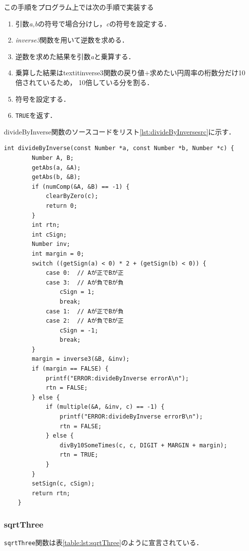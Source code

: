 \documentclass[a4paper,11pt,dvipdfmx]{jsarticle}
\begin{document}
この手順をプログラム上では次の手順で実装する

\begin{enumerate}
    \item 引数\textit{a,b}の符号で場合分けし，\textit{c}の符号を設定する．
    \item \textit{inverse3}関数を用いて逆数を求める．
    \item 逆数を求めた結果を引数\textit{a}と乗算する．
    \item 乗算した結果はtextit{inverse3}関数の戻り値$+$求めたい円周率の桁数分だけ10倍されているため，
    10倍している分を割る．
    \item 符号を設定する．
    \item \texttt{TRUE}を返す．
\end{enumerate}

divideByInverse関数のソースコードをリスト\ref{lst:divideByInversesrc}に示す．

\begin{lstlisting}[caption=\texttt{divideByInverse}関数,label=lst:divideByInversesrc]
    int divideByInverse(const Number *a, const Number *b, Number *c) {
        Number A, B;
        getAbs(a, &A);
        getAbs(b, &B);
        if (numComp(&A, &B) == -1) {
            clearByZero(c);
            return 0;
        }
        int rtn;
        int cSign;
        Number inv;
        int margin = 0;
        switch ((getSign(a) < 0) * 2 + (getSign(b) < 0)) {
            case 0:  // Aが正でBが正
            case 3:  // Aが負でBが負
                cSign = 1;
                break;
            case 1:  // Aが正でBが負
            case 2:  // Aが負でBが正
                cSign = -1;
                break;
        }
        margin = inverse3(&B, &inv);
        if (margin == FALSE) {
            printf("ERROR:divideByInverse errorA\n");
            rtn = FALSE;
        } else {
            if (multiple(&A, &inv, c) == -1) {
                printf("ERROR:divideByInverse errorB\n");
                rtn = FALSE;
            } else {
                divBy10SomeTimes(c, c, DIGIT + MARGIN + margin);
                rtn = TRUE;
            }
        }
        setSign(c, cSign);
        return rtn;
    }
\end{lstlisting}

\subsubsection{sqrtThree}
\texttt{sqrtThree}関数は表\ref{table:lst:sqrtThree}のように宣言されている．
\end{document}
